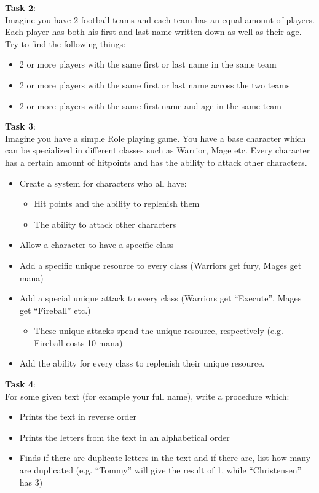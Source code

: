 \textbf{Task 2}:\\
Imagine you have 2 football teams and each team has an equal amount of players. Each player has both his first and last name written down as well as their age. Try to find the following things:
\begin{itemize}
\item 2 or more players with the same first or last name in the same team
\item 2 or more players with the same first or last name across the two teams
\item 2 or more players with the same first name and age in the same team
\end{itemize}

\textbf{Task 3}:\\
Imagine you have a simple Role playing game. You have a base character which can be specialized in different classes such as Warrior, Mage etc. Every character has a certain amount of hitpoints and has the ability to attack other characters. 
\begin{itemize}
\item Create a system for characters who all have:
\begin{itemize}
\item Hit points and the ability to replenish them
\item The ability to attack other characters
\end{itemize}
\item Allow a character to have a specific class
\item Add a specific unique resource to every class (Warriors get fury, Mages get mana)
\item Add a special unique attack to every class (Warriors get “Execute”, Mages get “Fireball” etc.)
\begin{itemize}
\item These unique attacks spend the unique resource, respectively (e.g. Fireball costs 10 mana) 
\end{itemize}
\item Add the ability for every class to replenish their unique resource.
\end{itemize}

\textbf{Task 4}:\\
For some given text (for example your full name), write a procedure which:
\begin{itemize}
\item Prints the text in reverse order
\item Prints the letters from the text in an alphabetical order
\item Finds if there are duplicate letters in the text and if there are, list how many are duplicated (e.g. “Tommy” will give the result of 1, while “Christensen” has 3) 
\end{itemize}

